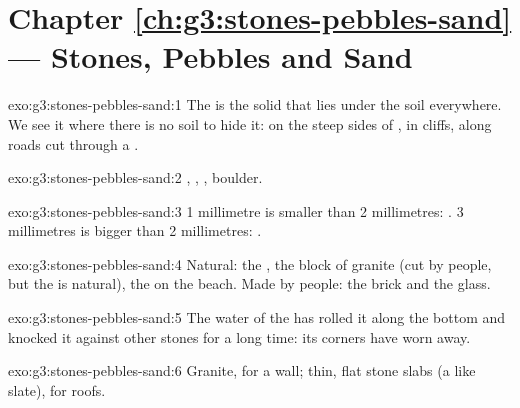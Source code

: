 \section*{Chapter \ref{ch:g3:stones-pebbles-sand} --- Stones, Pebbles and Sand}

\begin{solution}{exo:g3:stones-pebbles-sand:1}
The  is the solid  that lies under the soil everywhere. We see
it where there is no soil to hide it: on the steep sides of , in
 cliffs, along roads cut through a .
\end{solution}

\begin{solution}{exo:g3:stones-pebbles-sand:2}
, , , boulder.
\end{solution}

\begin{solution}{exo:g3:stones-pebbles-sand:3}
1 millimetre is smaller than 2 millimetres: . 3 millimetres is bigger
than 2 millimetres: .
\end{solution}

\begin{solution}{exo:g3:stones-pebbles-sand:4}
Natural: the , the block of granite (cut by people, but the  is
natural), the  on the beach. Made by people: the brick and the glass.
\end{solution}

\begin{solution}{exo:g3:stones-pebbles-sand:5}
The water of the  has rolled it along the bottom and knocked it
against other stones for a long time: its corners have worn away.
\end{solution}

\begin{solution}{exo:g3:stones-pebbles-sand:6}
Granite, for a wall; thin, flat stone slabs (a  like slate), for roofs.
\end{solution}

